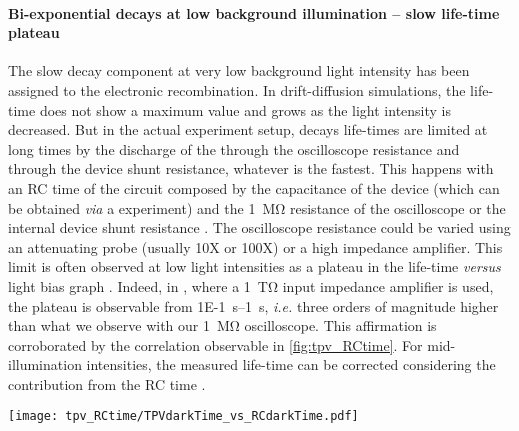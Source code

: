 	\paragraph{Bi-exponential decays at low background illumination -- slow life-time plateau}
	The slow decay component at very low background light intensity has been assigned to the electronic recombination.
	In drift-diffusion simulations, the life-time does not show a maximum value and grows as the light intensity is decreased.
	But in the actual experiment setup, decays life-times are limited at long times by the discharge of the through the oscilloscope resistance and through the device shunt resistance, whatever is the fastest.
	This happens with an RC time of the circuit composed by the capacitance of the device (which can be obtained \textit{via} a  experiment) and the \SI{1}{\Mohm} resistance of the oscilloscope or the internal device shunt resistance \cite{Tvingstedt2017}.
	The oscilloscope resistance could be varied using an attenuating probe (usually 10X or 100X) or a high impedance amplifier.
	This limit is often observed at low light intensities as a plateau in the  life-time \textit{versus} light bias graph \cite{Tvingstedt2017}.
	Indeed, in , where a \SI{1}{\tera\ohm} input impedance amplifier is used, the plateau is observable from \SIrange{1E-1}{1}{\s}, \textit{i.e.} three orders of magnitude higher than what we observe with our \SI{1}{\Mohm} oscilloscope.
	This affirmation is corroborated by the correlation observable in \cref{fig:tpv_RCtime}.
	For mid-illumination intensities, the measured life-time can be corrected considering the contribution from the RC time \cite{Credgington2014}.

	\begin{SCfigure}
		\centering
		\texttt{[image: tpv\_RCtime/TPVdarkTime\_vs\_RCdarkTime.pdf]}
		\label{fig:tpv_RCtime}
	\end{SCfigure}

